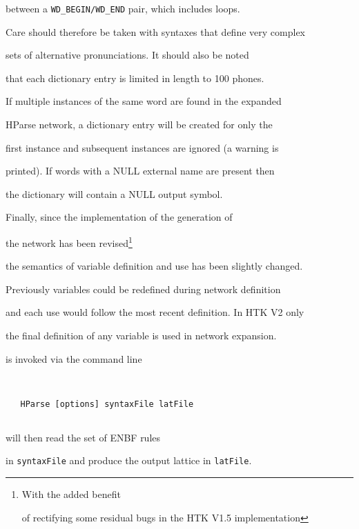 between a \texttt{WD\_BEGIN/WD\_END} pair, which includes loops.


Care should therefore be taken with syntaxes that define very complex


sets of alternative pronunciations.  It should also be noted


that each dictionary entry is limited in length to 100 phones.


If multiple instances of the same word are found in the expanded


HParse network, a dictionary entry will be created for only the


first instance and subsequent instances are ignored (a warning is


printed). If words with a NULL external name are present then 


the dictionary will contain a NULL output symbol.





Finally, since the implementation of the generation of


the  network has been revised\footnote{With the added benefit


of rectifying some residual bugs in the HTK V1.5 implementation}


the semantics of variable definition and use has been slightly changed. 


Previously variables could be redefined during network definition


and each use would follow the most recent definition. In HTK V2 only


the final definition of any variable is used in network expansion.










 is invoked via the command line


\begin{verbatim}


   HParse [options] syntaxFile latFile


\end{verbatim}


 will then read the set of ENBF rules 


in \texttt{syntaxFile} and produce the output lattice in \texttt{latFile}.





